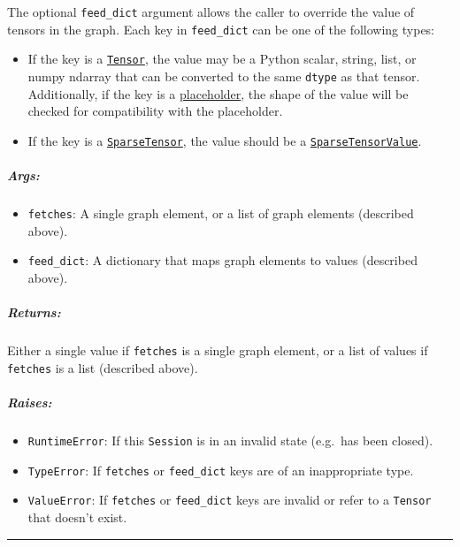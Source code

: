 The optional \texttt{feed\_dict} argument allows the caller to override
the value of tensors in the graph. Each key in \texttt{feed\_dict} can
be one of the following types:

\begin{itemize}
\tightlist
\item
  If the key is a
  \href{../../api_docs/python/framework.md\#Tensor}{\texttt{Tensor}},
  the value may be a Python scalar, string, list, or numpy ndarray that
  can be converted to the same \texttt{dtype} as that tensor.
  Additionally, if the key is a
  \href{../../api_docs/python/io_ops.md\#placeholder}{placeholder}, the
  shape of the value will be checked for compatibility with the
  placeholder.
\item
  If the key is a
  \href{../../api_docs/python/sparse_ops.md\#SparseTensor}{\texttt{SparseTensor}},
  the value should be a
  \href{../../api_docs/python/sparse_ops.md\#SparseTensorValue}{\texttt{SparseTensorValue}}.
\end{itemize}

\subparagraph{Args: }\label{args-1}

\begin{itemize}
\tightlist
\item
  \texttt{fetches}: A single graph element, or a list of graph elements
  (described above).
\item
  \texttt{feed\_dict}: A dictionary that maps graph elements to values
  (described above).
\end{itemize}

\subparagraph{Returns: }\label{returns}

Either a single value if \texttt{fetches} is a single graph element, or
a list of values if \texttt{fetches} is a list (described above).

\subparagraph{Raises: }\label{raises}

\begin{itemize}
\tightlist
\item
  \texttt{RuntimeError}: If this \texttt{Session} is in an invalid state
  (e.g.~has been closed).
\item
  \texttt{TypeError}: If \texttt{fetches} or \texttt{feed\_dict} keys
  are of an inappropriate type.
\item
  \texttt{ValueError}: If \texttt{fetches} or \texttt{feed\_dict} keys
  are invalid or refer to a \texttt{Tensor} that doesn't exist.
\end{itemize}

\begin{center}\rule{0.5\linewidth}{\linethickness}\end{center}

